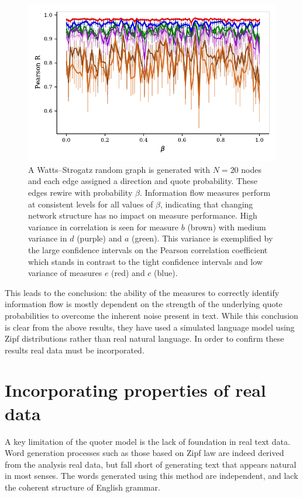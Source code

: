 \begin{figure}[!htbp]
	\centering
	\includegraphics{chapter3/figs/zipf_watts_strogatz.pdf}
	\caption{A Watts–Strogatz random graph is generated with $N=20$ nodes and each edge assigned a direction and quote probability. These edges rewire with probability $\beta$. Information flow measures perform at consistent levels for all values of $\beta$, indicating that changing network structure has no impact on measure performance. 
	High variance in correlation is seen for measure {\color{brown}$b$ (brown)} with medium variance in {\color{violet}$d$ (purple)} and {\color{green!80!black}$a$ (green)}. This variance is exemplified by the large confidence intervals on the Pearson correlation coefficient which stands in contrast to the tight confidence intervals and low variance of measures {\color{red}$e$ (red)} and {\color{blue!80!black}$c$ (blue)}.}
	\label{fig:flow_zipf_watts_strogatz_model}
\end{figure}

This leads to the conclusion: the ability of the measures to correctly identify information flow is mostly dependent on the strength of the underlying quote probabilities to overcome the inherent noise present in text. While this conclusion is clear from the above results, they have used a simulated language model using Zipf distributions rather than real natural language. In order to confirm these results real data must be incorporated.


\section{Incorporating properties of real data}
A key limitation of the quoter model is the lack of foundation in real text data. Word generation processes such as those based on Zipf law are indeed derived from the analysis real data, but fall short of generating text that appears natural in most senses. The words generated using this method are independent, and lack the coherent structure of English grammar.

